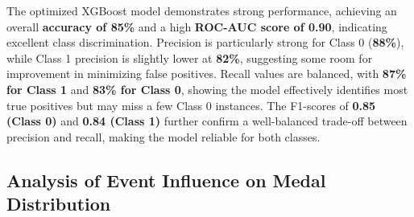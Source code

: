\documentclass{mcmthesis}
\begin{document}
The optimized XGBoost model demonstrates strong performance, achieving an overall \textbf{accuracy of 85\%} and a high \textbf{ROC-AUC score of 0.90}, indicating excellent class discrimination. Precision is particularly strong for Class 0 (\textbf{88\%}), while Class 1 precision is slightly lower at \textbf{82\%}, suggesting some room for improvement in minimizing false positives. Recall values are balanced, with \textbf{87\% for Class 1} and \textbf{83\% for Class 0}, showing the model effectively identifies most true positives but may miss a few Class 0 instances. The F1-scores of \textbf{0.85 (Class 0)} and \textbf{0.84 (Class 1)} further confirm a well-balanced trade-off between precision and recall, making the model reliable for both classes.
	
	
	
	
	

	
\subsection{Analysis of Event Influence on Medal Distribution}
\end{document}
